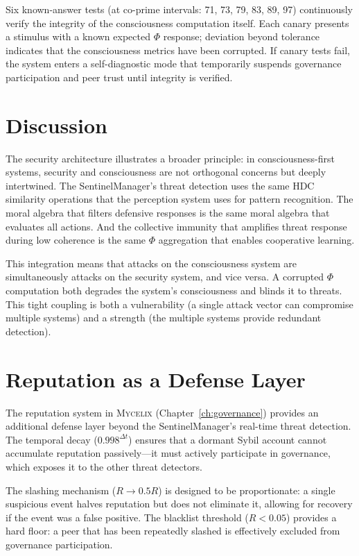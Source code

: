 \documentclass[12pt]{book}
\newcommand{\mycelix}{\textsc{Mycelix}}
\begin{document}
Six known-answer tests (at co-prime intervals: 71, 73, 79, 83, 89, 97) continuously verify the integrity of the consciousness computation itself. Each canary presents a stimulus with a known expected $\Phi$ response; deviation beyond tolerance indicates that the consciousness metrics have been corrupted. If canary tests fail, the system enters a self-diagnostic mode that temporarily suspends governance participation and peer trust until integrity is verified.

\section{Discussion}

The security architecture illustrates a broader principle: in consciousness-first systems, security and consciousness are not orthogonal concerns but deeply intertwined. The SentinelManager's threat detection uses the same HDC similarity operations that the perception system uses for pattern recognition. The moral algebra that filters defensive responses is the same moral algebra that evaluates all actions. And the collective immunity that amplifies threat response during low coherence is the same $\Phi$ aggregation that enables cooperative learning.

This integration means that attacks on the consciousness system are simultaneously attacks on the security system, and vice versa. A corrupted $\Phi$ computation both degrades the system's consciousness and blinds it to threats. This tight coupling is both a vulnerability (a single attack vector can compromise multiple systems) and a strength (the multiple systems provide redundant detection).

\section{Reputation as a Defense Layer}

The reputation system in \mycelix{} (Chapter~\ref{ch:governance}) provides an additional defense layer beyond the SentinelManager's real-time threat detection. The temporal decay ($0.998^{\Delta t}$) ensures that a dormant Sybil account cannot accumulate reputation passively---it must actively participate in governance, which exposes it to the other threat detectors.

The slashing mechanism ($R \to 0.5R$) is designed to be proportionate: a single suspicious event halves reputation but does not eliminate it, allowing for recovery if the event was a false positive. The blacklist threshold ($R < 0.05$) provides a hard floor: a peer that has been repeatedly slashed is effectively excluded from governance participation.
\end{document}
